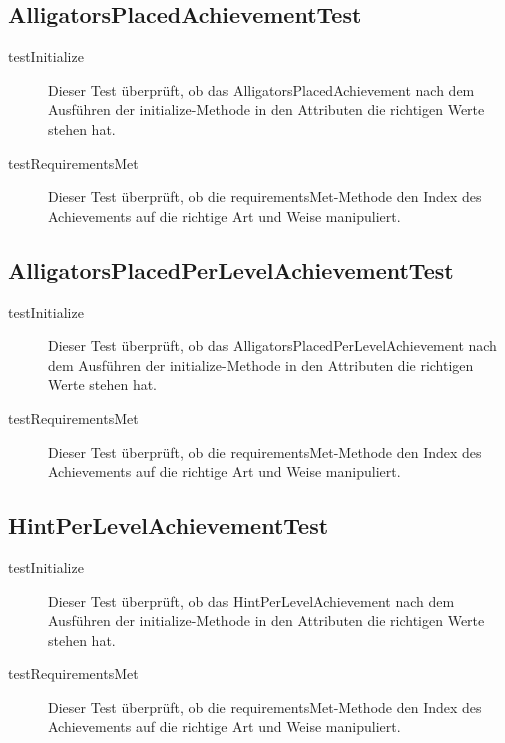 \subsection{AlligatorsPlacedAchievementTest}

\begin{description}
\item[testInitialize]
Dieser Test überprüft, ob das AlligatorsPlacedAchievement nach dem Ausführen der initialize-Methode in den Attributen die richtigen Werte stehen hat.

\item[testRequirementsMet]
Dieser Test überprüft, ob die requirementsMet-Methode den Index des Achievements auf die richtige Art und Weise manipuliert.

\end{description}

\subsection{AlligatorsPlacedPerLevelAchievementTest}

\begin{description}
\item[testInitialize]
Dieser Test überprüft, ob das AlligatorsPlacedPerLevelAchievement nach dem Ausführen der initialize-Methode in den Attributen die richtigen Werte stehen hat.

\item[testRequirementsMet]
Dieser Test überprüft, ob die requirementsMet-Methode den Index des Achievements auf die richtige Art und Weise manipuliert.

\end{description}

\subsection{HintPerLevelAchievementTest}

\begin{description}
\item[testInitialize]
Dieser Test überprüft, ob das HintPerLevelAchievement nach dem Ausführen der initialize-Methode in den Attributen die richtigen Werte stehen hat.

\item[testRequirementsMet]
Dieser Test überprüft, ob die requirementsMet-Methode den Index des Achievements auf die richtige Art und Weise manipuliert.

\end{description}

